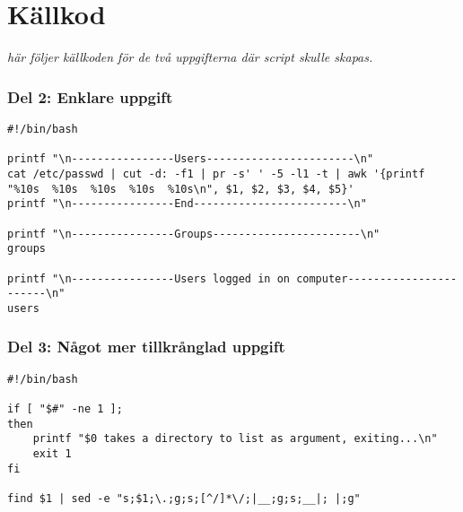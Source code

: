 \documentclass[11pt, titlepage, oneside, a4paper]{article}
\newcommand{\Section}[1]{\section{#1}\vspace{-8pt}}
\newcommand{\Subsubsection}[1]{\vspace{-4pt}\subsubsection{#1}\vspace{-8pt}}
\begin{document}
	
	\Section{Källkod}
	\emph{här följer källkoden för de två uppgifterna där script skulle skapas.}
	\Subsubsection{Del 2: Enklare uppgift}

	\begin{lstlisting}
#!/bin/bash

printf "\n----------------Users-----------------------\n"
cat /etc/passwd | cut -d: -f1 | pr -s' ' -5 -l1 -t | awk '{printf "%10s  %10s  %10s  %10s  %10s\n", $1, $2, $3, $4, $5}' 
printf "\n----------------End------------------------\n"

printf "\n----------------Groups-----------------------\n"
groups

printf "\n----------------Users logged in on computer-----------------------\n"
users
\end{lstlisting}
	
	\Subsubsection{Del 3: Något mer tillkrånglad uppgift}
	\begin{lstlisting}
#!/bin/bash

if [ "$#" -ne 1 ];
then
    printf "$0 takes a directory to list as argument, exiting...\n"
    exit 1
fi

find $1 | sed -e "s;$1;\.;g;s;[^/]*\/;|__;g;s;__|; |;g"
	\end{lstlisting}

	
	
\end{document}

